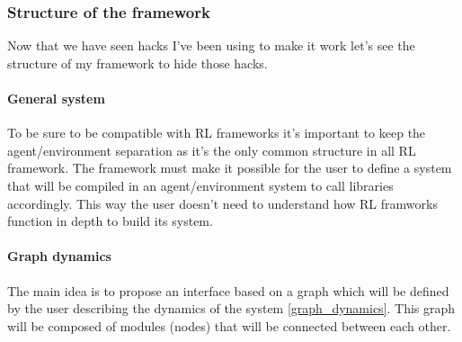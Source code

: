 \documentclass[11pt]{article}
\begin{document}
\subsubsection{Structure of the framework}
Now that we have seen hacks I've been using to make it work let's see the structure of my framework to hide those hacks.
\paragraph{General system}
To be sure to be compatible with RL frameworks it's important to keep the agent/environment separation as it's the only common structure in all RL framework. The framework must make it possible for the user to define a system that will be compiled in an agent/environment system to call libraries accordingly. This way the user doesn't need to understand how RL framworks function in depth to build its system.
\paragraph{Graph dynamics}
The main idea is to propose an interface based on a graph which will be defined by the user describing the dynamics of the system \ref{graph_dynamics}. This graph will be composed of modules (nodes) that will be connected between each other.
\end{document}
